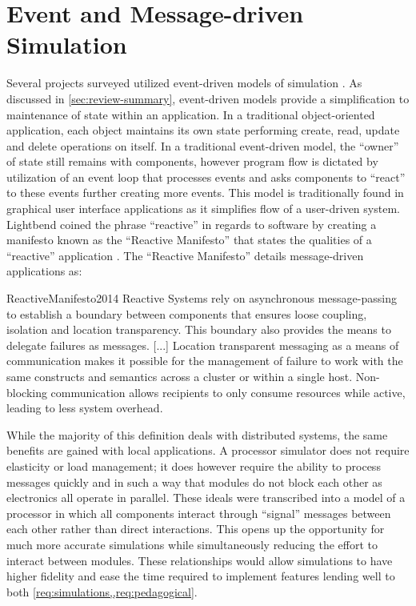 \section{Event and Message-driven Simulation}

Several projects surveyed utilized event-driven models of simulation \cite{Nakamura2013, McLoughlin2010, Garcia2009}. As discussed in \cref{sec:review-summary}, event-driven models provide a simplification to maintenance of state within an application. In a traditional object-oriented application, each object maintains its own state performing create, read, update and delete operations on itself. In a traditional event-driven model, the ``owner'' of state still remains with components, however program flow is dictated by utilization of an event loop that processes events and asks components to ``react'' to these events further creating more events. This model is traditionally found in graphical user interface applications as it simplifies flow of a user-driven system. Lightbend coined the phrase ``reactive'' in regards to software by creating a manifesto known as the ``Reactive Manifesto'' that states the qualities of a ``reactive'' application \cite{ReactiveManifesto2014}. The ``Reactive Manifesto'' details message-driven applications as: 
\begin{displaycquote}{ReactiveManifesto2014}
    Reactive Systems rely on asynchronous message-passing to establish a boundary between components that ensures loose coupling, isolation and location transparency. This boundary also provides the means to delegate failures as messages. [...] Location transparent messaging as a means of communication makes it possible for the management of failure to work with the same constructs and semantics across a cluster or within a single host. Non-blocking communication allows recipients to only consume resources while active, leading to less system overhead.
\end{displaycquote}
While the majority of this definition deals with distributed systems, the same benefits are gained with local applications. A processor simulator does not require elasticity or load management; it does however require the ability to process messages quickly and in such a way that modules do not block each other as electronics all operate in parallel. These ideals were transcribed into a model of a processor in which all components interact through ``signal'' messages between each other rather than direct interactions. This opens up the opportunity for much more accurate simulations while simultaneously reducing the effort to interact between modules. These relationships would allow simulations to have higher fidelity and ease the time required to implement features lending well to both \cref{req:simulations,,req:pedagogical}. 

